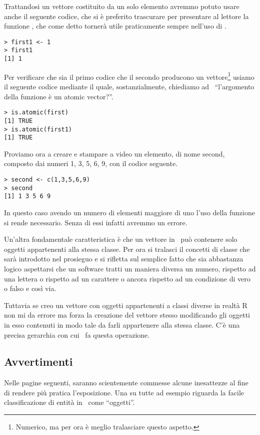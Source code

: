Trattandosi un vettore costituito da un solo elemento avremmo potuto usare anche il seguente codice, che si è preferito trascurare per presentare al lettore la funzione , che come detto tornerà utile praticamente sempre nell'uso di \erre.
\begin{lstlisting}
> first1 <- 1
> first1
[1] 1
\end{lstlisting}

Per verificare che sia il primo codice che il secondo producono un vettore\footnote{Numerico, ma per ora è meglio tralasciare questo aspetto.} usiamo il seguente codice mediante il quale, sostanzialmente, chiediamo ad \erre\  ``l'argomento della funzione  è un atomic vector?''.
\begin{lstlisting}
> is.atomic(first)
[1] TRUE
> is.atomic(first1)
[1] TRUE
\end{lstlisting}

Proviamo ora a creare e stampare a video un elemento, di nome second, composto dai numeri 1, 3, 5, 6, 9, con il codice seguente.
\begin{lstlisting}
> second <- c(1,3,5,6,9)
> second
[1] 1 3 5 6 9
\end{lstlisting}

In questo caso avendo un numero di elementi maggiore di uno l'uso della funzione  si rende necessario. Senza di essi infatti avremmo un errore.

Un'altra fondamentale caratteristica è che un vettore in \erre\ può contenere solo oggetti appartenenti alla stessa classe. Per ora si tralasci il concetti di classe che sarà introdotto nel prosieguo e si rifletta sul semplice fatto che sia abbastanza logico aspettarsi che un software tratti un maniera diversa un numero, rispetto ad una lettera o rispetto ad un carattere o ancora rispetto ad un condizione di vero o falso e così via.

Tuttavia se creo un vettore con oggetti appartenenti a classi diverse in realtà R non mi da errore ma forza la creazione del vettore stesso modificando gli oggetti in esso contenuti in modo tale da farli appartenere alla stessa classe. C’è una precisa gerarchia con cui \erre\ fa questa operazione.

\subsection{Avvertimenti}
Nelle pagine seguenti, saranno scientemente commesse alcune inesattezze al fine di rendere più pratica l'esposizione. Una su tutte ad esempio riguarda la facile classificazione di entità in \erre\ come ``oggetti''.

